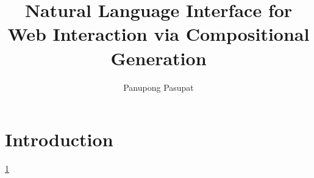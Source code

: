 \documentclass[12pt]{report}
\begin{document}
\title{Natural Language Interface for Web Interaction via Compositional Generation}
\author{Panupong Pasupat}
 
\beforepreface


\afterpreface


\chapter{Introduction}\label{chp:intro}


\ref{chp:intro}

\appendix



\end{document}
